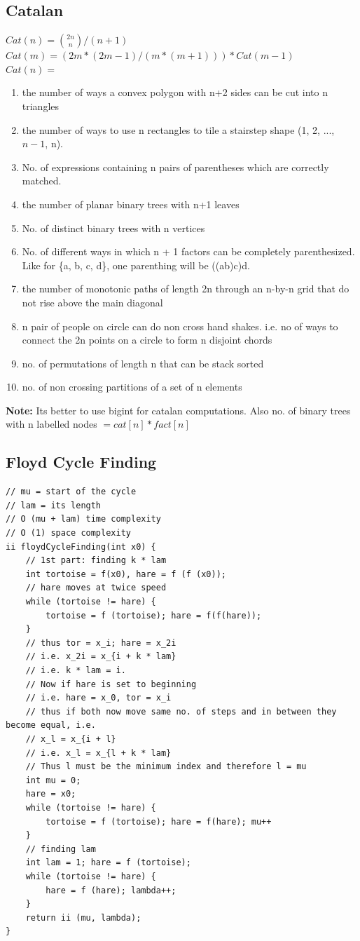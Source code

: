 \documentclass[8pt, a4paper, oneside, twocolumn]{extarticle}
\begin{document}
\subsection{Catalan}
$Cat(n) = \binom{2n}{n} / (n + 1)$
\\$Cat(m) = (2m*(2m - 1)/(m*(m + 1))) * Cat(m - 1)$
\\$Cat(n) = $\begin{enumerate}
    \item the number of ways a convex polygon with n+2 sides can be cut into n triangles
    \item the number of ways to use n rectangles to tile a stairstep shape (1, 2, ..., $n−1$, n).
    \item No. of expressions containing n pairs of parentheses which are correctly matched.
    \item the number of planar binary trees with n+1 leaves
    \item No. of distinct binary trees with n vertices
    \item No. of different ways in which n + 1 factors can be completely parenthesized. Like for \{a, b, c, d\}, one parenthing will be ((ab)c)d.
    \item the number of monotonic paths of length 2n through an n-by-n grid that do not rise above the main diagonal
    \item n pair of people on circle can do non cross hand shakes. i.e. no of ways to connect the 2n points on a circle to form n disjoint chords
    \item no. of permutations of length n that can be stack sorted
    \item no. of non crossing partitions of a set of n elements
\end{enumerate}
\textbf{Note: }Its better to use bigint for catalan computations. Also no. of binary trees with n labelled nodes $= cat[n] * fact[n]$
\subsection{Floyd Cycle Finding}
\begin{verbatim}
// mu = start of the cycle
// lam = its length
// O (mu + lam) time complexity
// O (1) space complexity
ii floydCycleFinding(int x0) {
    // 1st part: finding k * lam
    int tortoise = f(x0), hare = f (f (x0));
    // hare moves at twice speed
    while (tortoise != hare) {
        tortoise = f (tortoise); hare = f(f(hare));
    }
    // thus tor = x_i; hare = x_2i
    // i.e. x_2i = x_{i + k * lam}
    // i.e. k * lam = i.
    // Now if hare is set to beginning
    // i.e. hare = x_0, tor = x_i
    // thus if both now move same no. of steps and in between they become equal, i.e.
    // x_l = x_{i + l}
    // i.e. x_l = x_{l + k * lam}
    // Thus l must be the minimum index and therefore l = mu
    int mu = 0;
    hare = x0;
    while (tortoise != hare) {
        tortoise = f (tortoise); hare = f(hare); mu++
    }
    // finding lam
    int lam = 1; hare = f (tortoise);
    while (tortoise != hare) {
        hare = f (hare); lambda++;
    }
    return ii (mu, lambda);
}
\end{verbatim}
\end{document}
